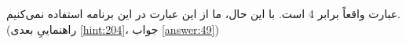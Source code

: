 \section{}
\paragraph{}\label{hint:266}
عبارت  واقعاً برابر 4 است. با این حال، ما از این عبارت در این برنامه استفاده نمی‌کنیم. (راهنماییِ بعدی \ref{hint:204}، جواب \ref{answer:49})